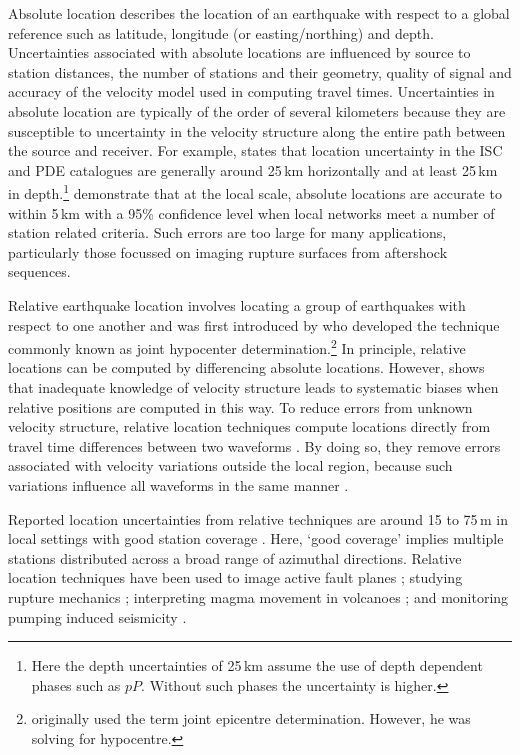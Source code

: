 \documentclass[extra, onecolumn, doublespacing]{gji}
\begin{document}
Absolute location describes the location of an earthquake with
respect to a global reference such as latitude, longitude (or
easting/northing) and depth. Uncertainties associated with absolute
locations are influenced by source to station distances, the number
of stations and their geometry, quality of signal and accuracy of
the velocity model used in computing travel times. Uncertainties in
absolute location are typically of the order of several kilometers
because they are susceptible to uncertainty in the velocity
structure along the entire path between the source and receiver. For
example, \citet{dr_Shearer99a} states that location uncertainty in
the ISC and PDE catalogues are generally around 25\,km horizontally
and at least 25\,km in depth.\footnote{Here the depth uncertainties
of 25\,km assume the use of depth dependent phases such as $pP$.
Without such phases the uncertainty is higher.} \citet{dr_Bondar04a}
demonstrate that at the local scale, absolute locations are accurate
to within 5\,km with a 95\% confidence level when local networks
meet a number of station related criteria. Such errors are too large
for many applications, particularly those focussed on imaging
rupture surfaces from aftershock sequences.

Relative earthquake location involves locating a group of
earthquakes with respect to one another and was first introduced by
\citet{dr_Douglas67a} who developed the technique commonly known as
joint hypocenter determination.\footnote{\citet{dr_Douglas67a}
originally used the term joint epicentre determination. However, he
was solving for hypocentre.} In principle, relative locations can be
computed by differencing absolute locations. However,
\citet{dr_Pavlis92a} shows that inadequate knowledge of velocity
structure leads to systematic biases when relative positions are
computed in this way. To reduce errors from unknown velocity
structure, relative location techniques compute locations directly
from travel time differences between two waveforms
\citep{dr_Ito85a, dr_Got94a, dr_Nadeau97a, dr_Waldhauser99a}. By doing
so, they remove errors associated with velocity variations outside
the local region, because such variations influence all waveforms in
the same manner \citep{dr_Shearer99a}.

Reported location uncertainties from relative techniques are  around
15 to 75\,m in local settings with good station coverage
\citep{dr_Ito85a, dr_Got94a, dr_Waldhauser99a,dr_Waldhauser08a}.
Here, `good coverage' implies multiple stations distributed across a
broad range of azimuthal directions. Relative location techniques
have been used to image active fault planes \citep{dr_Deichmann92a,
dr_Got94a, dr_Waldhauser99a, dr_Waldhauser02a, dr_Shearer05a};
studying rupture mechanics \citep{dr_Rubin99a, dr_Rubin02a};
interpreting magma movement in volcanoes \citep{dr_Fremont87a}; and
monitoring pumping induced seismicity \citep{dr_Lees98a, dr_Ake05a}.
\end{document}
